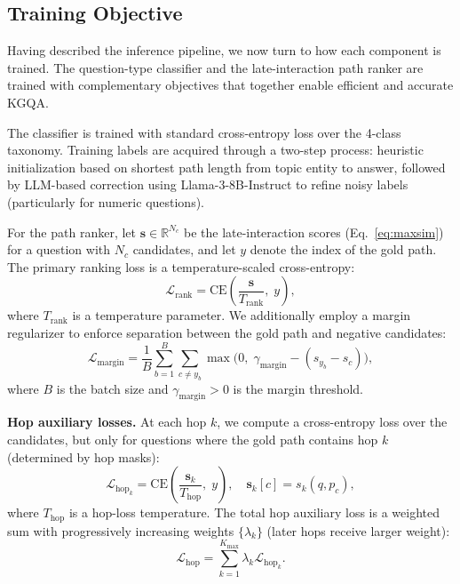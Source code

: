 \documentclass[conference]{IEEEtran}
\begin{document}
\subsection{Training Objective}
\label{sec:training}

Having described the inference pipeline, we now turn to how each component is trained. The question-type classifier and the late-interaction path ranker are trained with complementary objectives that together enable efficient and accurate KGQA.

The classifier is trained with standard cross-entropy loss over the 4-class taxonomy. Training labels are acquired through a two-step process: heuristic initialization based on shortest path length from topic entity to answer, followed by LLM-based correction using Llama-3-8B-Instruct to refine noisy labels (particularly for numeric questions).

For the path ranker, let $\mathbf{s}\in\mathbb{R}^{N_c}$ be the late-interaction scores (Eq.~\ref{eq:maxsim}) for a question with $N_c$ candidates, and let $y$ denote the index of the gold path. The primary ranking loss is a temperature-scaled cross-entropy:
\begin{equation}
\label{eq:rank-loss}
\mathcal{L}_{\text{rank}}=\text{CE}\left(\frac{\mathbf{s}}{T_{\text{rank}}},\;y\right),
\end{equation}
where $T_{\text{rank}}$ is a temperature parameter. We additionally employ a margin regularizer to enforce separation between the gold path and negative candidates:
\begin{equation}
\label{eq:margin-loss}
\mathcal{L}_{\text{margin}}=\frac{1}{B}\sum_{b=1}^{B}\sum_{c\ne y_b}\max\big(0,\;\gamma_{\text{margin}}-(s_{y_b}-s_c)\big),
\end{equation}
where $B$ is the batch size and $\gamma_{\text{margin}}>0$ is the margin threshold.

\textbf{Hop auxiliary losses.} At each hop $k$, we compute a cross-entropy loss over the candidates, but only for questions where the gold path contains hop $k$ (determined by hop masks):
\begin{equation}
\label{eq:hop-loss}
    \mathcal{L}_{\text{hop}_k}=\text{CE}\left(\frac{\mathbf{s}_k}{T_{\text{hop}}},\;y\right),\quad \mathbf{s}_k[c]=s_k(q,p_c),
\end{equation}
where $T_{\text{hop}}$ is a hop-loss temperature. The total hop auxiliary loss is a weighted sum with progressively increasing weights $\{\lambda_k\}$ (later hops receive larger weight):
\begin{equation}
\label{eq:hop-total}
    \mathcal{L}_{\text{hop}} = \sum_{k=1}^{K_{\text{max}}} \lambda_k \mathcal{L}_{\text{hop}_k}.
\end{equation}
\end{document}

